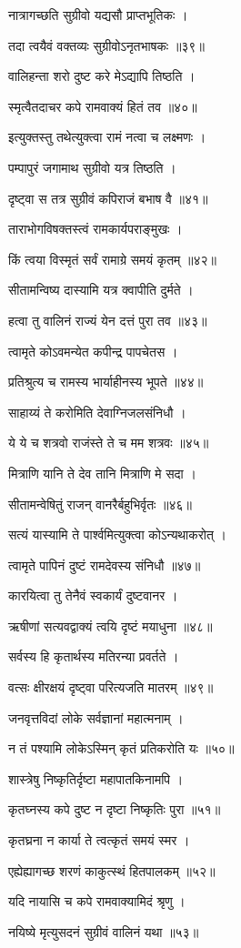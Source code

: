 नात्रागच्छति सुग्रीवो यद्यसौ प्राप्तभूतिकः ।

तदा त्वयैवं वक्तव्यः सुग्रीवोऽनृतभाषकः ॥३९॥

वालिहन्ता शरो दुष्ट करे मेऽद्यापि तिष्ठति ।

स्मृत्वैतदाचर कपे रामवाक्यं हितं तव ॥४०॥

इत्युक्तस्तु तथेत्युक्त्वा रामं नत्वा च लक्ष्मणः ।

पम्पापुरं जगामाथ सुग्रीवो यत्र तिष्ठति ।

दृष्ट्वा स तत्र सुग्रीवं कपिराजं बभाष वै ॥४१॥

ताराभोगविषक्तस्त्वं रामकार्यपराङ्मुखः ।

किं त्वया विस्मृतं सर्वं रामाग्रे समयं कृतम् ॥४२॥

सीतामन्विष्य दास्यामि यत्र क्वापीति दुर्मते ।

हत्वा तु वालिनं राज्यं येन दत्तं पुरा तव ॥४३॥

त्वामृते कोऽवमन्येत कपीन्द्र पापचेतस ।

प्रतिश्रुत्य च रामस्य भार्याहीनस्य भूपते ॥४४॥

साहाय्यं ते करोमिति देवाग्निजलसंनिधौ ।

ये ये च शत्रवो राजंस्ते ते च मम शत्रवः ॥४५॥

मित्राणि यानि ते देव तानि मित्राणि मे सदा ।

सीतामन्वेषितुं राजन् वानरैर्बहुभिर्वृतः ॥४६॥

सत्यं यास्यामि ते पार्श्वमित्युक्त्वा कोऽन्यथाकरोत् ।

त्वामृते पापिनं दुष्टं रामदेवस्य संनिधौ ॥४७॥

कारयित्वा तु तेनैवं स्वकार्यं दुष्टवानर ।

ऋषीणां सत्यवद्वाक्यं त्वयि दृष्टं मयाधुना ॥४८॥

सर्वस्य हि कृतार्थस्य मतिरन्या प्रवर्तते ।

वत्सः क्षीरक्षयं दृष्ट्वा परित्यजति मातरम् ॥४९॥

जनवृत्तविदां लोके सर्वज्ञानां महात्मनाम् ।

न तं पश्यामि लोकेऽस्मिन् कृतं प्रतिकरोति यः ॥५०॥

शास्त्रेषु निष्कृतिर्दृष्टा महापातकिनामपि ।

कृतघ्नस्य कपे दुष्ट न दृष्टा निष्कृतिः पुरा ॥५१॥

कृतघ्रना न कार्या ते त्वत्कृतं समयं स्मर ।

एह्येह्यागच्छ शरणं काकुत्स्थं हितपालकम् ॥५२॥

यदि नायासि च कपे रामवाक्यामिदं श्रृणु ।

नयिष्ये मृत्युसदनं सुग्रीवं वालिनं यथा ॥५३॥


